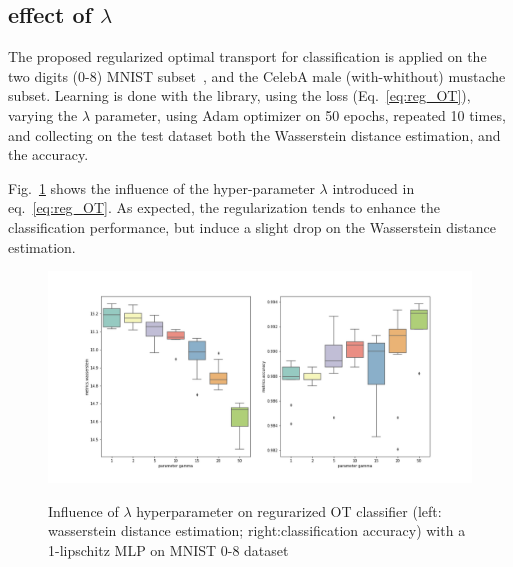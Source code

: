 \subsection{effect of $\lambda$}
\label{sec:lambda_effect}
The proposed regularized optimal transport for classification is applied on the two digits (0-8) MNIST subset~\cite{Lecun98}, and the CelebA\cite{liu2015faceattributes} male (with-whithout) mustache subset.
Learning is done with the \Deellip library, using the  loss (Eq.~\ref{eq:reg_OT}), varying the $\lambda$ parameter, using Adam optimizer on 50 epochs, repeated 10 times, and collecting on the test dataset both the Wasserstein distance estimation, and the accuracy.

Fig.~\ref{fig:influence_alpha_param} shows the influence of the hyper-parameter $\lambda$ introduced in eq.~\ref{eq:reg_OT}. %
As expected, the regularization tends to enhance the classification performance, but induce a slight drop on the Wasserstein distance estimation.





\begin{figure}
\centering
\includegraphics[width=1\linewidth]{img/MNIST08_classifier_param_gamma_wass_accuracy_metric.png}
\label{fig:wass_acc_alpha_param}
\caption{Influence of $\lambda$ hyperparameter on regurarized OT classifier (left: wasserstein distance estimation; right:classification accuracy) with a 1-lipschitz MLP on MNIST 0-8 dataset}
\label{fig:influence_alpha_param}
\end{figure}

